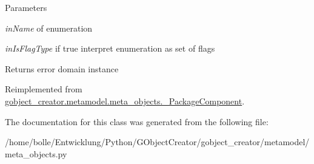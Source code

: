 \begin{DoxyParams}{Parameters}
\item[{\em inName}]of enumeration \item[{\em inIsFlagType}]if true interpret enumeration as set of flags \end{DoxyParams}
\begin{DoxyReturn}{Returns}
error domain instance 
\end{DoxyReturn}


Reimplemented from \hyperlink{classgobject__creator_1_1metamodel_1_1meta__objects_1_1__PackageComponent}{gobject\_\-creator.metamodel.meta\_\-objects.\_\-PackageComponent}.



The documentation for this class was generated from the following file:\begin{DoxyCompactItemize}
\item 
/home/bolle/Entwicklung/Python/GObjectCreator/gobject\_\-creator/metamodel/meta\_\-objects.py\end{DoxyCompactItemize}
